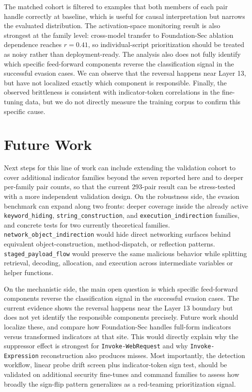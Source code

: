 \documentclass{article}
\begin{document}
The matched cohort is filtered to examples that both members of each pair handle correctly at baseline, which is useful for causal interpretation but narrows the evaluated distribution. The activation-space monitoring result is also strongest at the family level: cross-model transfer to Foundation-Sec ablation dependence reaches \(r = 0.41\), so individual-script prioritization should be treated as noisy rather than deployment-ready. The analysis also does not fully identify which specific feed-forward components reverse the classification signal in the successful evasion cases. We can observe that the reversal happens near Layer 13, but have not localized exactly which component is responsible. Finally, the observed brittleness is consistent with indicator-token correlations in the fine-tuning data, but we do not directly measure the training corpus to confirm this specific cause.

\section{Future Work}
Next steps for this line of work can include extending the validation cohort to cover additional indicator families beyond the seven reported here and to deeper per-family pair counts, so that the current 293-pair result can be stress-tested with a more independent validation design. On the robustness side, the evasion benchmark can expand along two fronts: deeper coverage inside the already active \texttt{keyword\_hiding}, \texttt{string\_construction}, and \texttt{execution\_indirection} families, and concrete tests for two currently theoretical families. \texttt{network\_object\_indirection} would hide direct networking surfaces behind equivalent object-construction, method-dispatch, or reflection patterns. \texttt{staged\_payload\_flow} would preserve the same malicious behavior while splitting retrieval, decoding, allocation, and execution across intermediate variables or helper functions.

On the mechanistic side, the main open question is which specific feed-forward components reverse the classification signal in the successful evasion cases. The current evidence shows the reversal happens near the Layer 13 boundary but does not yet identify the responsible components precisely. Future work should localize these, and compare how Foundation-Sec handles full-form indicators versus transformed indicators at that site. This would directly explain why the suppressor effect is strongest for \texttt{Invoke-WebRequest} and why \texttt{Invoke-Expression} reconstruction also produces misses. Most importantly, the detection workflow, linear probe drift screen plus indicator-token sign test, should be validated on additional security fine-tunes and command families to assess how broadly the sign-flip pattern generalizes as a red-teaming prioritization signal.
\end{document}

